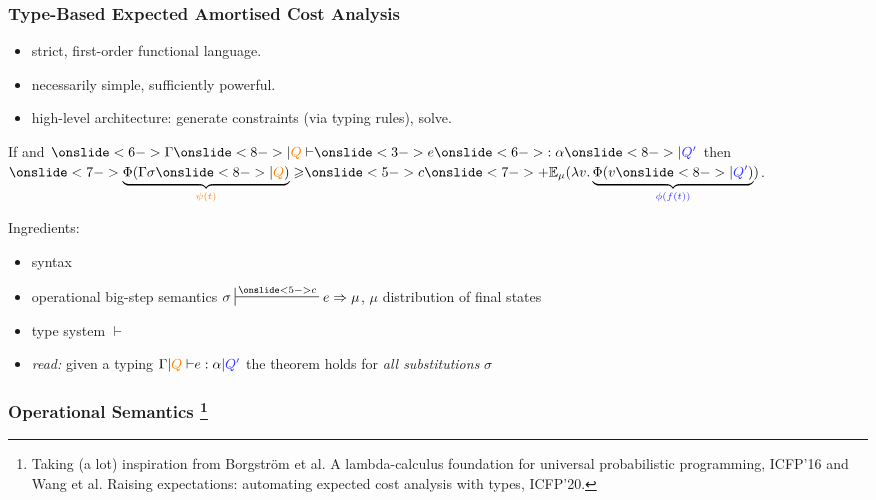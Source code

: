 \documentclass[
11pt,
usepdftitle=false,
aspectratio=169,
xcolor={table,usenames,dvipsnames},
]{beamer}
\newcommand{\red}[1]{{\color{orange} #1}} %
\newcommand{\blue}[1]{{\color{blue!80} #1}}
\begin{document}
\begin{frame}
  \frametitle{Type-Based Expected Amortised Cost Analysis}
\begin{itemize}
\item \alert<3>{strict, first-order functional language.}
\item \alert<3>{necessarily simple, sufficiently powerful.}
\item{high-level architecture: generate constraints (via typing rules), solve.}
\end{itemize}

\begin{theorem}[Soundness]
\centering
\smallskip  
If
and
$\onslide<6->{\Gamma \onslide<8->{{\mid} \red{Q}} \vdash} \onslide<3->{e} \onslide<6->{: \alpha} \onslide<8->{{\mid} \blue{Q'}}$
then
$\onslide<7->{\underbrace{\Phi(\Gamma\sigma\onslide<8->{{\mid} \red{Q}})}_{\red{\psi(t)}} \geqslant} \onslide<5->{c}
  \onslide<7->{+ \Expect{\mu}{\lambda v. \underbrace{\Phi(v \onslide<8->{{\mid} \blue{Q'}})}_{\blue{\phi(f(t))}}}}$.
\end{theorem}
 
Ingredients:
\begin{itemize}
\item<3-> \alert<3>{syntax}
\item<4-> operational big-step semantics \alert<4>{$\eval{\sigma}{\onslide<5->{c}}{e}{\mu}$, $\mu$ distribution of final states} 
\item<6-> type system $\vdash$ 
\item<9-> \emph{read:} given a typing ${\Gamma {{\mid} \red{Q}} \vdash} {e: \alpha}{{\mid} \blue{Q'}}$ the theorem holds for
  \emph{all substitutions} $\sigma$    
\end{itemize}
\end{frame}

\begin{frame}
  \frametitle{Operational Semantics%
    \footnote{%
    Taking (a lot) inspiration from Borgström et al. A lambda-calculus foundation for universal probabilistic programming, ICFP'16 and Wang et al. Raising expectations: automating expected cost analysis with types, ICFP'20.}}
  

\end{frame}
\end{document}
